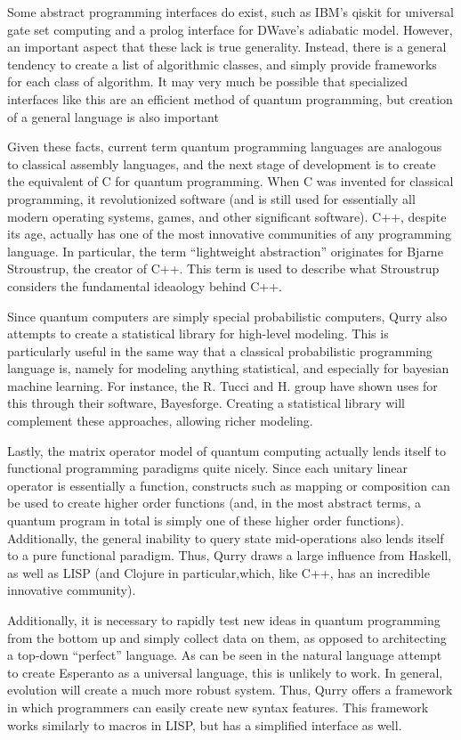 \documentclass[journal]{IEEEtran}
\begin{document}
Some abstract programming interfaces do exist, such as IBM's qiskit for universal gate set computing and a prolog interface for DWave's adiabatic model.
However, an important aspect that these lack is true generality.
Instead, there is a general tendency to create a list of algorithmic classes, and simply provide frameworks for each class of algorithm.
It may very much be possible that specialized interfaces like this are an efficient method of quantum programming, but creation of a general language is also important

Given these facts, current term quantum programming languages are analogous to classical assembly languages, and the next stage of development is to create the equivalent of C for quantum programming.
When C was invented for classical programming, it revolutionized software (and is still used for essentially all modern operating systems, games, and other significant software). 
C++, despite its age, actually has one of the most innovative communities of any programming language.
In particular, the term ``lightweight abstraction'' originates for Bjarne Stroustrup, the creator of C++. 
This term is used to describe what Stroustrup considers the fundamental ideaology behind C++.

Since quantum computers are simply special probabilistic computers, Qurry also attempts to create a statistical library for high-level modeling. 
This is particularly useful in the same way that a classical probabilistic programming language is, namely for modeling anything statistical, and especially for bayesian machine learning.
For instance, the R. Tucci and H. group have shown uses for this through their software, Bayesforge.
Creating a statistical library will complement these approaches, allowing richer modeling.

Lastly, the matrix operator model of quantum computing actually lends itself to functional programming paradigms quite nicely.
Since each unitary linear operator is essentially a function, constructs such as mapping or composition can be used to create higher order functions (and, in the most abstract terms, a quantum program in total is simply one of these higher order functions).
Additionally, the general inability to query state mid-operations also lends itself to a pure functional paradigm.
Thus, Qurry draws a large influence from Haskell, as well as LISP (and Clojure in particular,which, like C++, has an incredible innovative community).

Additionally, it is necessary to rapidly test new ideas in quantum programming from the bottom up and simply collect data on them, as opposed to architecting a top-down ``perfect'' language.
As can be seen in the natural language attempt to create Esperanto as a universal language, this is unlikely to work.
In general, evolution will create a much more robust system.
Thus, Qurry offers a framework in which programmers can easily create new syntax features.
This framework works similarly to macros in LISP, but has a simplified interface as well.
\end{document}

